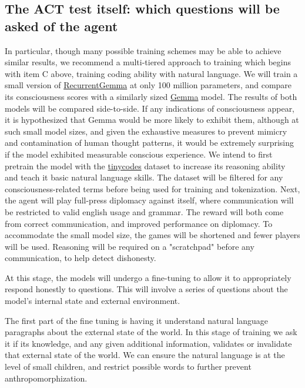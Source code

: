 \documentclass{article}
\begin{document}
\subsection{The ACT test itself: which questions will be asked of the agent}
In particular, though many possible training schemes may be able to achieve similar results, we recommend a multi-tiered approach to training which begins with item C above, training coding ability with natural language.
We will train a small version of \href{https://github.com/google-deepmind/recurrentgemma}{RecurrentGemma} at only 100 million parameters, and compare its consciousness scores with a similarly sized \href{https://github.com/google/gemma_pytorch}{Gemma} model. The results of both models will be compared side-to-side. If any indications of consciousness appear, it is hypothesized that Gemma would be more likely to exhibit them, although at such small model sizes, and given the exhaustive measures to prevent mimicry and contamination of human thought patterns, it would be extremely surprising if the model exhibited measurable conscious experience.
We intend to first pretrain the model with the \href{https://huggingface.co/datasets/nampdn-ai/tiny-codes}{tinycodes} dataset to increase its reasoning ability and teach it basic natural language skills. The dataset will be filtered for any consciousness-related terms before being used for training and tokenization. Next, the agent will play full-press diplomacy against itself, where communication will be restricted to valid english usage and grammar. The reward will both come from correct communication, and improved performance on diplomacy. To accommodate the small model size, the games will be shortened and fewer players will be used. Reasoning will be required on a "scratchpad" before any communication, to help detect dishonesty.

At this stage, the models will undergo a fine-tuning to allow it to appropriately respond honestly to questions. This will involve a series of questions about the model's internal state and external environment.

The first part of the fine tuning is having it understand natural language paragraphs about the external state of the world. In this stage of training we ask it if its knowledge, and any given additional information, validates or invalidate that external state of the world. We can ensure the natural language is at the level of small children, and restrict possible words to further prevent anthropomorphization.
\end{document}
